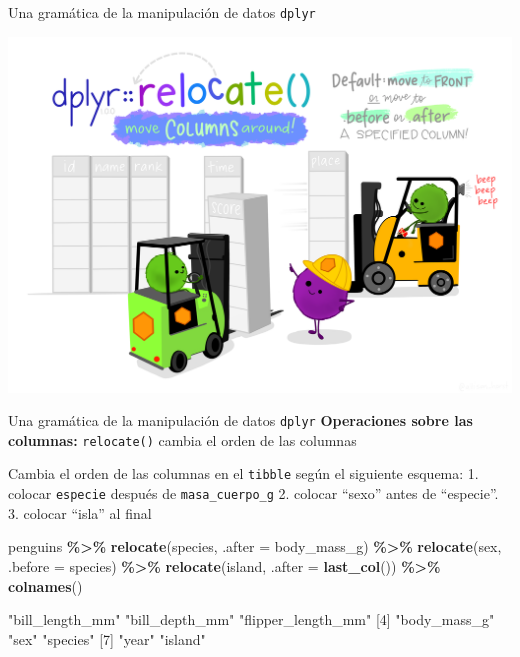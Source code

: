 \documentclass[
  ignorenonframetext,
  aspectratio=169]{beamer}
\newenvironment{Shaded}{\begin{snugshade}}{\end{snugshade}}
\newcommand{\AttributeTok}[1]{\textcolor[rgb]{0.13,0.29,0.53}{#1}}
\newcommand{\FunctionTok}[1]{\textcolor[rgb]{0.13,0.29,0.53}{\textbf{#1}}}
\newcommand{\NormalTok}[1]{#1}
\newcommand{\SpecialCharTok}[1]{\textcolor[rgb]{0.81,0.36,0.00}{\textbf{#1}}}
\let\oldverbatim\verbatim
\let\endoldverbatim\endverbatim
\renewenvironment{verbatim}{\tiny\oldverbatim}{\endoldverbatim}
\begin{document}
\begin{frame}{Una gramática de la manipulación de datos \texttt{dplyr}}
\label{una-gramuxe1tica-de-la-manipulaciuxf3n-de-datos-dplyr-19}
\begin{center}\includegraphics[width=0.6\linewidth]{Imgs/dplyr_relocate} \end{center}
\end{frame}

\begin{frame}[fragile]{Una gramática de la manipulación de datos
\texttt{dplyr}}
\label{una-gramuxe1tica-de-la-manipulaciuxf3n-de-datos-dplyr-20}
\textbf{Operaciones sobre las columnas:} \texttt{relocate()} cambia el
orden de las columnas

Cambia el orden de las columnas en el \texttt{tibble} según el siguiente
esquema: 1. colocar \texttt{especie} después de \texttt{masa\_cuerpo\_g}
2. colocar ``sexo'' antes de ``especie''. 3. colocar ``isla'' al final

\begin{Shaded}
\begin{Highlighting}[]
\NormalTok{penguins }\SpecialCharTok{\%\textgreater{}\%} 
  \FunctionTok{relocate}\NormalTok{(species, }\AttributeTok{.after =}\NormalTok{ body\_mass\_g) }\SpecialCharTok{\%\textgreater{}\%}
  \FunctionTok{relocate}\NormalTok{(sex, }\AttributeTok{.before =}\NormalTok{ species) }\SpecialCharTok{\%\textgreater{}\%}
  \FunctionTok{relocate}\NormalTok{(island, }\AttributeTok{.after =} \FunctionTok{last\_col}\NormalTok{()) }\SpecialCharTok{\%\textgreater{}\%}
  \FunctionTok{colnames}\NormalTok{()}
\end{Highlighting}
\end{Shaded}

\begin{verbatim}
[1] "bill_length_mm"    "bill_depth_mm"     "flipper_length_mm"
[4] "body_mass_g"       "sex"               "species"          
[7] "year"              "island"           
\end{verbatim}
\end{frame}
\end{document}
